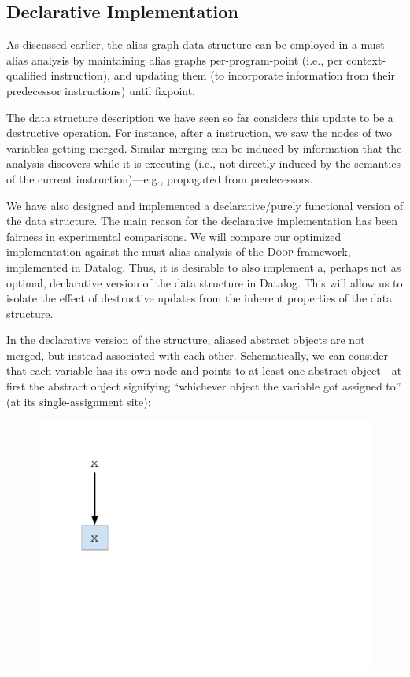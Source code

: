 \subsection{Declarative Implementation}

As discussed earlier, the alias graph data structure can be employed
in a must-alias analysis by maintaining alias graphs per-program-point
(i.e., per context-qualified instruction), and updating them (to
incorporate information from their predecessor instructions) until
fixpoint.

The data structure description we have seen so far considers this
update to be a destructive operation. For instance, after a
 instruction, we saw the nodes of two variables getting
merged. Similar merging can be induced by information that the
analysis discovers while it is executing (i.e., not directly induced
by the semantics of the current instruction)---e.g., propagated from
predecessors.

We have also designed and implemented a declarative/purely functional version
of the data structure. The main reason for the declarative implementation has
been fairness in experimental comparisons. We will compare our optimized
implementation against the must-alias analysis of the \textsc{Doop} framework,
implemented in Datalog. Thus, it is desirable to also implement a, perhaps not
as optimal, declarative version of the data structure in Datalog. This will
allow us to isolate the effect of destructive updates from the inherent
properties of the data structure.

In the declarative version of the structure, aliased abstract objects
are not merged, but instead associated with each other. Schematically,
we can consider that each variable has its own node and points to
at least one abstract object---at first the abstract object signifying
``whichever object the variable got assigned to'' (at its single-assignment
site):


\begin{figure}[h]
  \begin{minipage}[b]{\linewidth}
    \centering
    \includegraphics[trim={25mm 90mm 190mm 25mm},clip,width=0.15\linewidth]{assets/must-data/decl-alias-graph0.pdf}
  \end{minipage}
\end{figure}

